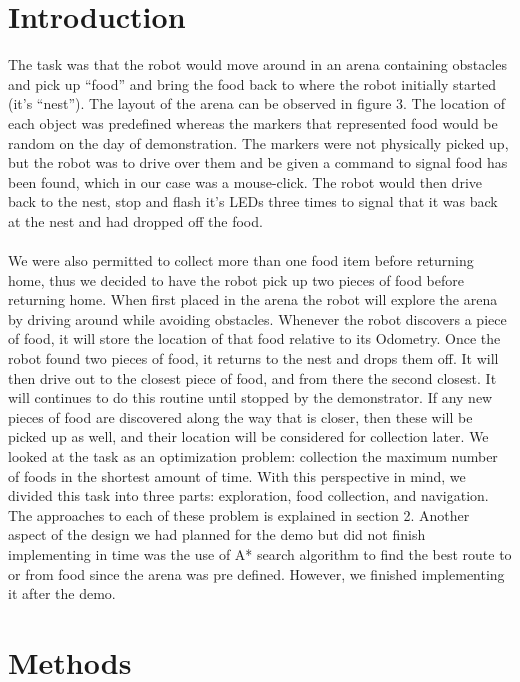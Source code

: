 \documentclass[]{article}
\begin{document}
\section{Introduction}
The task was that the robot would move around in an arena containing obstacles and pick up ``food'' and bring the food back to where the robot initially started  (it's ``nest''). The layout of the arena can be observed in figure 3. The location of each object was predefined whereas the markers that represented food would be random on the day of demonstration. The markers were not physically picked up, but the robot was to drive over them and be given a command to signal food has been found, which in our case was a mouse-click. The robot would then drive back to the nest, stop and flash it's LEDs three times to signal that it was back at the nest and had dropped off the food.\\\\
We were also permitted to collect more than one food item before returning home, thus we decided to have the robot pick up two pieces of food before returning home. When first placed in the arena the robot will explore the arena by driving around while avoiding obstacles. Whenever the robot discovers a piece of food, it will store the location of that food relative to its Odometry. Once the robot found two pieces of food, it returns to the nest and drops them off. It will then drive out to the closest piece of food, and from there the second closest. It will continues to do this routine until stopped by the demonstrator. If any new pieces of food are discovered along the way that is closer, then these will be picked up as well, and their location will be considered for collection later. We looked at the task as an optimization problem: collection the maximum number of foods in the shortest amount of time. With this perspective in mind, we divided this task into three parts: exploration, food collection, and navigation. The approaches to each of these problem is explained in section 2. Another aspect of the design we had planned for the demo but did not finish implementing in time was the use of A* search algorithm to find the best route to or from food since the arena was pre defined. However, we finished implementing it after the demo.

\section{Methods}
\end{document}
